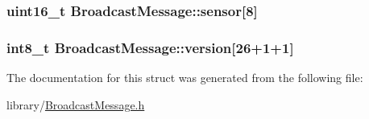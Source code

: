 \hypertarget{struct_broadcast_message_adfe11beb5dc63400e112cfe2bf59fd0b}{
\subsubsection[{sensor}]{\setlength{\rightskip}{0pt plus 5cm}uint16\-\_\-t Broadcast\-Message\-::sensor\mbox{[}8\mbox{]}}}\label{struct_broadcast_message_adfe11beb5dc63400e112cfe2bf59fd0b}
\hypertarget{struct_broadcast_message_ac348f0fde101e0d4ecb2ea47de28b8dc}{
\subsubsection[{version}]{\setlength{\rightskip}{0pt plus 5cm}int8\-\_\-t Broadcast\-Message\-::version\mbox{[}26+1+1\mbox{]}}}\label{struct_broadcast_message_ac348f0fde101e0d4ecb2ea47de28b8dc}


The documentation for this struct was generated from the following file\-:\begin{DoxyCompactItemize}
\item 
library/\hyperlink{_broadcast_message_8h}{Broadcast\-Message.\-h}\end{DoxyCompactItemize}
